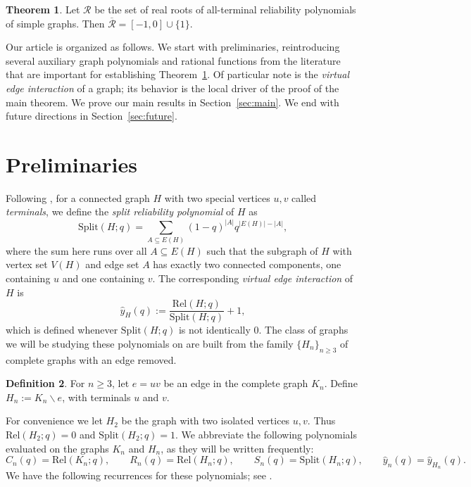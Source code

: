 \documentclass[12pt]{amsart}
\theoremstyle{definition}
\newtheorem{theorem}{Theorem}[section]
\newtheorem{definition}[theorem]{Definition}
\renewcommand{\S}{\text{Split}}
\newcommand{\R}{\text{Rel}}
\begin{document}
\begin{theorem}\label{thm:main}
Let $\mathcal{R}$ be the set of real roots of all-terminal reliability polynomials of simple graphs. Then $\overline{\mathcal{R}}=[-1,0] \cup \{1\}$.
\end{theorem}

Our article is organized as follows. We start with preliminaries, reintroducing several auxiliary graph polynomials and rational functions from the literature that are important for establishing Theorem~\ref{thm:main}. Of particular note is the \emph{virtual edge interaction} of a graph; its behavior is the local driver of the proof of the main theorem. We prove our main results in Section~\ref{sec:main}. We end with future directions in Section~\ref{sec:future}.


\section{Preliminaries}\label{sec:prelim}
Following \cite{BrownMol2017}, for a connected graph $H$ with two special vertices $u,v$ called \emph{terminals}, we define the \emph{split reliability polynomial} of $H$ as
\[
\S(H;q)=\sum_{A \subseteq E(H)} (1-q)^{|A|} q^{|E(H)|-|A|},
\]
where the sum here runs over all $A \subseteq E(H)$ such that the subgraph of $H$ with vertex set $V(H)$ and edge set $A$ has exactly two connected components, one containing $u$ and one containing $v$. The corresponding \emph{virtual edge interaction} of $H$ is
\[
\hat{y}_{H}(q) := \frac{\R(H;q)}{\S(H;q)}+1,
\]
which is defined whenever $\S(H;q)$ is not identically $0$. The class of graphs we will be studying these polynomials on are built from the family $\{H_n\}_{n \geq 3}$ of complete graphs with an edge removed.
\begin{definition}
For $n \geq 3$, let $e=uv$ be an edge in the complete graph $K_n$. Define $H_n:=K_n \backslash e$, with terminals $u$ and $v$. 
\end{definition}
For convenience we let $H_2$ be the graph with two isolated vertices $u,v$. Thus $\R(H_2;q)=0$ and $\S(H_2;q)=1$. We abbreviate the following polynomials evaluated on the graphs $K_n$ and $H_n$, as they will be written frequently:
\[
C_n(q)=\R(K_n;q), \qquad R_n(q)=\R(H_n;q), \qquad S_n(q)=\S(H_n;q), \qquad \hat{y}_n(q)=\hat{y}_{H_n}(q).
\]
We have the following recurrences for these polynomials; see \cite{BrownMol2017}.
\end{document}
